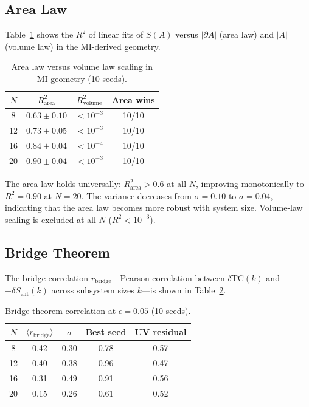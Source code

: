 \documentclass[aps,pra,twocolumn,superscriptaddress,floatfix]{revtex4-2}
\begin{document}
\subsection{Area Law}

Table~\ref{tab:area} shows the $R^2$ of linear fits of $S(A)$ versus $|\partial A|$ (area law) and $|A|$ (volume law) in the MI-derived geometry.

\begin{table}[h]
\caption{Area law versus volume law scaling in MI geometry (10 seeds).}
\label{tab:area}
\begin{ruledtabular}
\begin{tabular}{cccc}
$N$ & $R^2_{\mathrm{area}}$ & $R^2_{\mathrm{volume}}$ & Area wins \\
\hline
8 & $0.63 \pm 0.10$ & $<10^{-3}$ & 10/10 \\
12 & $0.73 \pm 0.05$ & $<10^{-3}$ & 10/10 \\
16 & $0.84 \pm 0.04$ & $<10^{-4}$ & 10/10 \\
20 & $\mathbf{0.90 \pm 0.04}$ & $<10^{-3}$ & 10/10 \\
\end{tabular}
\end{ruledtabular}
\end{table}

The area law holds universally: $R^2_{\mathrm{area}} > 0.6$ at all $N$, improving monotonically to $R^2 = 0.90$ at $N = 20$.
The variance decreases from $\sigma = 0.10$ to $\sigma = 0.04$, indicating that the area law becomes more robust with system size.
Volume-law scaling is excluded at all $N$ ($R^2 < 10^{-3}$).

\subsection{Bridge Theorem}

The bridge correlation $r_{\mathrm{bridge}}$---Pearson correlation between $\delta\mathrm{TC}(k)$ and $-\delta S_{\mathrm{ent}}(k)$ across subsystem sizes $k$---is shown in Table~\ref{tab:bridge}.

\begin{table}[h]
\caption{Bridge theorem correlation at $\epsilon = 0.05$ (10 seeds).}
\label{tab:bridge}
\begin{ruledtabular}
\begin{tabular}{ccccc}
$N$ & $\langle r_{\mathrm{bridge}}\rangle$ & $\sigma$ & Best seed & UV residual \\
\hline
8 & 0.42 & 0.30 & 0.78 & 0.57 \\
12 & 0.40 & 0.38 & 0.96 & 0.47 \\
16 & 0.31 & 0.49 & 0.91 & 0.56 \\
20 & 0.15 & 0.26 & 0.61 & 0.52 \\
\end{tabular}
\end{ruledtabular}
\end{table}
\end{document}
